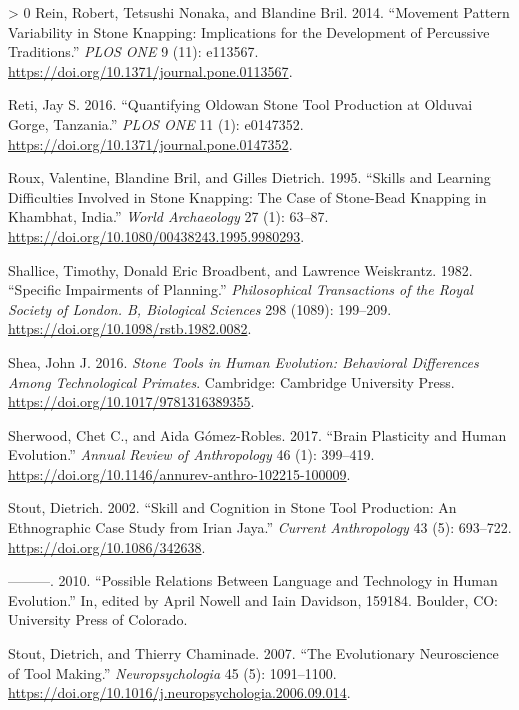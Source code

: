 \documentclass[smallextended]{svjour3}       %
\newlength{\cslhangindent}
\newenvironment{CSLReferences}[3] %
 {%
  \setlength{\parindent}{0pt}
  \ifodd #1 \everypar{\setlength{\hangindent}{\cslhangindent}}\ignorespaces\fi
  \ifnum #2 > 0
  \setlength{\parskip}{#3\baselineskip}
  \fi
 }%
 {}
\begin{document}
\begin{CSLReferences}{1}{0}
\leavevmode\hypertarget{ref-rein2014}{}%
Rein, Robert, Tetsushi Nonaka, and Blandine Bril. 2014. {``Movement
Pattern Variability in Stone Knapping: Implications for the Development
of Percussive Traditions.''} \emph{PLOS ONE} 9 (11): e113567.
\url{https://doi.org/10.1371/journal.pone.0113567}.

\leavevmode\hypertarget{ref-reti2016}{}%
Reti, Jay S. 2016. {``Quantifying Oldowan Stone Tool Production at
Olduvai Gorge, Tanzania.''} \emph{PLOS ONE} 11 (1): e0147352.
\url{https://doi.org/10.1371/journal.pone.0147352}.

\leavevmode\hypertarget{ref-roux1995}{}%
Roux, Valentine, Blandine Bril, and Gilles Dietrich. 1995. {``Skills and
Learning Difficulties Involved in Stone Knapping: The Case of
Stone{-}Bead Knapping in Khambhat, India.''} \emph{World Archaeology} 27
(1): 63--87. \url{https://doi.org/10.1080/00438243.1995.9980293}.

\leavevmode\hypertarget{ref-shallice1982}{}%
Shallice, Timothy, Donald Eric Broadbent, and Lawrence Weiskrantz. 1982.
{``Specific Impairments of Planning.''} \emph{Philosophical Transactions
of the Royal Society of London. B, Biological Sciences} 298 (1089):
199--209. \url{https://doi.org/10.1098/rstb.1982.0082}.

\leavevmode\hypertarget{ref-shea2016}{}%
Shea, John J. 2016. \emph{Stone Tools in Human Evolution: Behavioral
Differences Among Technological Primates}. Cambridge: Cambridge
University Press. \url{https://doi.org/10.1017/9781316389355}.

\leavevmode\hypertarget{ref-sherwood2017}{}%
Sherwood, Chet C., and Aida Gómez-Robles. 2017. {``Brain Plasticity and
Human Evolution.''} \emph{Annual Review of Anthropology} 46 (1):
399--419. \url{https://doi.org/10.1146/annurev-anthro-102215-100009}.

\leavevmode\hypertarget{ref-stout2002}{}%
Stout, Dietrich. 2002. {``Skill and Cognition in Stone Tool Production:
An Ethnographic Case Study from Irian Jaya.''} \emph{Current
Anthropology} 43 (5): 693--722. \url{https://doi.org/10.1086/342638}.

\leavevmode\hypertarget{ref-stout2010}{}%
---------. 2010. {``Possible Relations Between Language and Technology
in Human Evolution.''} In, edited by April Nowell and Iain Davidson,
159184. Boulder, CO: University Press of Colorado.

\leavevmode\hypertarget{ref-stout2007}{}%
Stout, Dietrich, and Thierry Chaminade. 2007. {``The Evolutionary
Neuroscience of Tool Making.''} \emph{Neuropsychologia} 45 (5):
1091--1100.
\url{https://doi.org/10.1016/j.neuropsychologia.2006.09.014}.


\end{CSLReferences}
\end{document}
